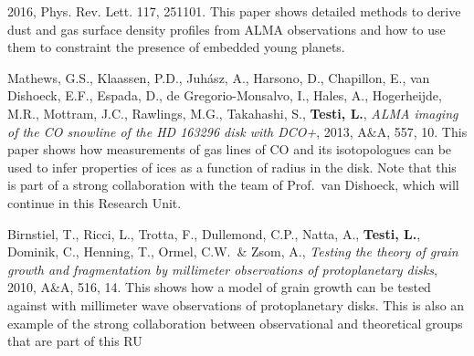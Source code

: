 \documentclass[10pt,fleqn,twoside]{article}
\begin{document}
\begin{literature}
    2016, Phys. Rev. Lett. 117, 251101. This paper shows detailed methods to derive
    dust and gas surface density profiles from ALMA observations and how to use them 
    to constraint the presence of embedded young planets.
\item Mathews, G.S., Klaassen, P.D., Juhász, A., Harsono, D., Chapillon, E.,
  van Dishoeck, E.F., Espada, D., de Gregorio-Monsalvo, I., Hales, A.,
  Hogerheijde, M.R., Mottram, J.C., Rawlings, M.G., Takahashi, S., {\bf
    Testi, L.}, {\em ALMA imaging of the CO snowline of the HD 163296 disk
    with DCO+}, 2013, A\&A, 557, 10. This paper shows how measurements of
  gas lines of CO and its isotopologues can be used to infer properties of
  ices as a function of radius in the disk.  Note that this is part of a
  strong collaboration with the team of Prof.~van Dishoeck, which will
  continue in this Research Unit.
\item Birnstiel, T., Ricci, L., Trotta, F., Dullemond, C.P., Natta, A.,
  {\bf Testi, L.}, Dominik, C., Henning, T., Ormel, C.W.\ \& Zsom, A., {\em
    Testing the theory of grain growth and fragmentation by millimeter
    observations of protoplanetary disks}, 2010, A\&A, 516, 14. This shows
  how a model of grain growth can be tested against with millimeter wave
  observations of protoplanetary disks. This is also an example of the strong
  collaboration between observational and theoretical groups that are part 
  of this RU

\end{literature}



% 
% 
% 
% 
% 
% 
\end{document}
